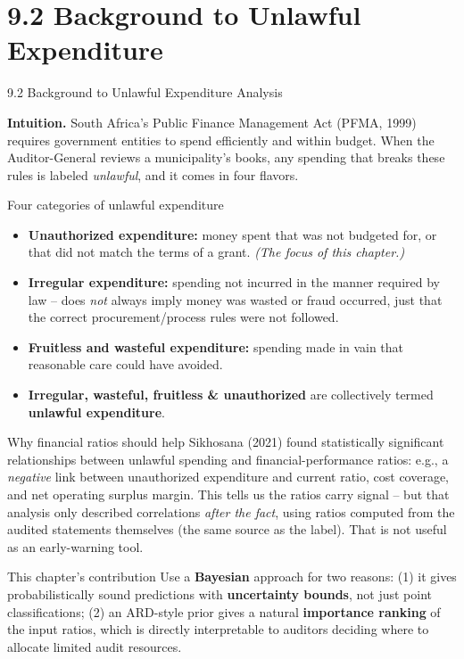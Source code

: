 \documentclass[aspectratio=169,10pt]{beamer}
\begin{document}
\section{9.2 Background to Unlawful Expenditure}

\begin{frame}[allowframebreaks]{9.2 Background to Unlawful Expenditure Analysis}

\textbf{Intuition.} South Africa's Public Finance Management Act (PFMA, 1999)
requires government entities to spend efficiently and within budget. When
the Auditor-General reviews a municipality's books, any spending that
breaks these rules is labeled \emph{unlawful}, and it comes in four flavors.

\begin{block}{Four categories of unlawful expenditure}
\begin{itemize}
  \item \textbf{Unauthorized expenditure:} money spent that was not budgeted
  for, or that did not match the terms of a grant. \emph{(The focus of this
  chapter.)}
  \item \textbf{Irregular expenditure:} spending not incurred in the manner
  required by law -- does \emph{not} always imply money was wasted or fraud
  occurred, just that the correct procurement/process rules were not
  followed.
  \item \textbf{Fruitless and wasteful expenditure:} spending made in vain
  that reasonable care could have avoided.
  \item \textbf{Irregular, wasteful, fruitless \& unauthorized} are
  collectively termed \textbf{unlawful expenditure}.
\end{itemize}
\end{block}

\framebreak

\begin{block}{Why financial ratios should help}
Sikhosana (2021) found statistically significant relationships between
unlawful spending and financial-performance ratios: e.g., a
\emph{negative} link between unauthorized expenditure and current ratio,
cost coverage, and net operating surplus margin. This tells us the ratios
carry signal -- but that analysis only described correlations \emph{after
the fact}, using ratios computed from the audited statements themselves
(the same source as the label). That is not useful as an early-warning
tool.
\end{block}

\begin{block}{This chapter's contribution}
Use a \textbf{Bayesian} approach for two reasons: (1) it gives
probabilistically sound predictions with \textbf{uncertainty bounds}, not
just point classifications; (2) an ARD-style prior gives a natural
\textbf{importance ranking} of the input ratios, which is directly
interpretable to auditors deciding where to allocate limited audit
resources.
\end{block}

\end{frame}
\end{document}
